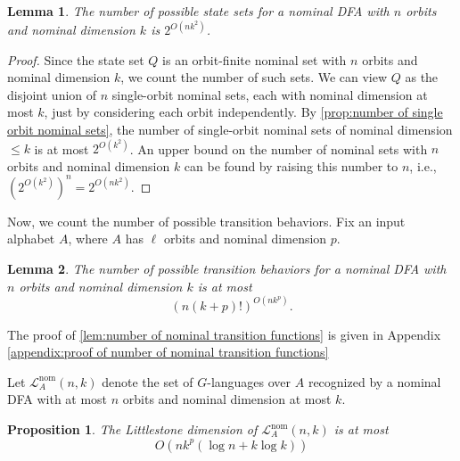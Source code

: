 \documentclass[11pt,a4paper]{amsart}
\newtheorem{lemma}{Lemma}
\newtheorem{proposition}{Proposition}
\theoremstyle{definition}
\newcommand{\mc}{\mathcal}
\begin{document}
\begin{lemma} \label{lem:number of nominal state sets}
    The number of possible state sets for a nominal DFA with $n$ orbits and nominal dimension $k$ is $2^{O(nk^2)}$.
\end{lemma}

\begin{proof}
    Since the state set $Q$ is an orbit-finite nominal set with $n$ orbits and nominal dimension $k$, we count the number of such sets. 
    We can view $Q$ as the disjoint union of $n$ single-orbit nominal sets, each with nominal dimension at most $k$, just by considering each orbit independently.
    By \autoref{prop:number of single orbit nominal sets}, the number of single-orbit nominal sets of nominal dimension $\leq k$ is at most $2^{O(k^2)}$.
    An upper bound on the number of nominal sets with $n$ orbits and nominal dimension $k$ can be found by raising this number to $n$, i.e., $\left(2^{O(k^2)}\right)^n = 2^{O(nk^2)}$.
\end{proof}


Now, we count the number of possible transition behaviors.
Fix an input alphabet $A$, where $A$ has $\ell$ orbits and nominal dimension $p$.


\begin{lemma} \label{lem:number of nominal transition functions}
    The number of possible transition behaviors for a nominal DFA with $n$ orbits and nominal dimension $k$ is at most 
    \[
    \left(n (k+p)!\right)^{O\left(nk^{p}\right)}.
    \]
\end{lemma}

The proof of \autoref{lem:number of nominal transition functions} is given in Appendix \ref{appendix:proof of number of nominal transition functions}

Let $\mc L^{\text{nom}}_A(n,k)$ denote the set of $G$-languages over $A$ recognized by a nominal DFA with at most $n$ orbits and nominal dimension at most $k$.

\begin{proposition} \label{prop:littlestone dimension of nominal automata}
    The Littlestone dimension of $\mc L^{\text{nom}}_A(n,k)$ is at most 
    \[
    O\left(nk^{p} \left(\log n + k \log k \right)\right)
    \]
\end{proposition}
\end{document}
